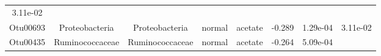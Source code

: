 \documentclass[11pt,]{article}
\begin{document}
\begin{longtable}[]{@{}cccccccc@{}}
\begin{minipage}[t]{0.08\columnwidth}
3.11e-02\strut
\end{minipage}\tabularnewline
\begin{minipage}[t]{0.08\columnwidth}\centering\strut
Otu00693\strut
\end{minipage} & \begin{minipage}[t]{0.15\columnwidth}\centering\strut
Proteobacteria\strut
\end{minipage} & \begin{minipage}[t]{0.15\columnwidth}\centering\strut
Proteobacteria\strut
\end{minipage} & \begin{minipage}[t]{0.08\columnwidth}\centering\strut
normal\strut
\end{minipage} & \begin{minipage}[t]{0.09\columnwidth}\centering\strut
acetate\strut
\end{minipage} & \begin{minipage}[t]{0.07\columnwidth}\centering\strut
-0.289\strut
\end{minipage} & \begin{minipage}[t]{0.08\columnwidth}\centering\strut
1.29e-04\strut
\end{minipage} & \begin{minipage}[t]{0.08\columnwidth}\centering\strut
3.11e-02\strut
\end{minipage}\tabularnewline
\begin{minipage}[t]{0.08\columnwidth}\centering\strut
Otu00435\strut
\end{minipage} & \begin{minipage}[t]{0.15\columnwidth}\centering\strut
Ruminococcaceae\strut
\end{minipage} & \begin{minipage}[t]{0.15\columnwidth}\centering\strut
Ruminococcaceae\strut
\end{minipage} & \begin{minipage}[t]{0.08\columnwidth}\centering\strut
normal\strut
\end{minipage} & \begin{minipage}[t]{0.09\columnwidth}\centering\strut
acetate\strut
\end{minipage} & \begin{minipage}[t]{0.07\columnwidth}\centering\strut
-0.264\strut
\end{minipage} & \begin{minipage}[t]{0.08\columnwidth}\centering\strut
5.09e-04\strut
\end{minipage} & \begin{minipage}[t]{0.08\columnwidth}\centering\strut

\end{minipage}
\end{longtable}
\end{document}
